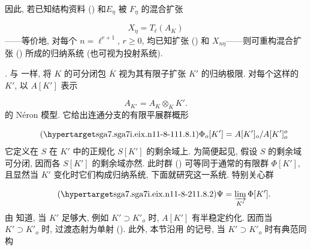 因此, 若已知结构资料 () 和$E_\eta$ 被 $F_\eta$ 的混合扩张

\begin{equation*}
X_\eta=T_\ell(A_K)
\end{equation*}
——等价地, 对每个 $n=\ell^{r+1}$, $r\geq0$, 均已知扩张 () 和 $X_{n\eta}$——则可重构混合扩张 () 所成的归纳系统 (也可视为投射系统).



. 与  一样, 将 $K$ 的可分闭包 $\overline K$ 视为其有限子扩张 $K'$ 的归纳极限. 对每个这样的 $K'$, 以 $A[K']$ 表示

\begin{equation*}
A_{K'}=A_K\otimes_K K'.
\end{equation*}
的 Néron 模型. 它给出连通分支的有限平展群概形

\begin{equation}\tag{\SGARefTarget{sga7.sga7i.eix.n11-8-1}{11.8.1}}
\Phi_o[K']=A[K']_o/A[K']_o^o
\end{equation}
它定义在 $S$ 在 $K'$ 中的正规化 $S[K']$ 的剩余域上. 为简便起见, 假设 $S$ 的剩余域可分闭, 因而各 $S[K']$ 的剩余域亦然. 此时群 () 可等同于通常的有限群 $\Phi[K']$, 且显然当 $K'$ 变化时它们构成归纳系统, 下面就研究这一系统. 特别关心群

\begin{equation}\tag{\SGARefTarget{sga7.sga7i.eix.n11-8-2}{11.8.2}}
\Psi=\varinjlim_{K'}\Phi[K'].
\end{equation}
由  知道, 当 $K'$ 足够大, 例如 $K'\supset K'_o$ 时, $A[K']$ 有半稳定约化. 因而当 $K'\supset K'_o$ 时, 过渡态射为单射 (). 此外, 本节沿用  的记号, 当 $K'\supset K'_o$ 时有典范同构


